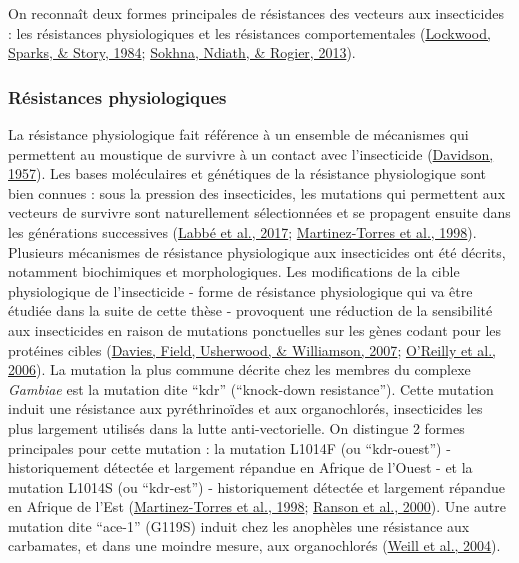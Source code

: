 \documentclass[12pt,twoside]{reedthesis}
\begin{document}
On reconnaît deux formes principales de résistances des vecteurs aux insecticides : les résistances physiologiques et les résistances comportementales (\protect\hyperlink{ref-lockwood_evolution_1984}{Lockwood, Sparks, \& Story, 1984}; \protect\hyperlink{ref-sokhna_changes_2013}{Sokhna, Ndiath, \& Rogier, 2013}).\\

\hypertarget{ruxe9sistances-physiologiques}{%
\subsubsection{Résistances physiologiques}\label{ruxe9sistances-physiologiques}}

La résistance physiologique fait référence à un ensemble de mécanismes qui permettent au moustique de survivre à un contact avec l'insecticide (\protect\hyperlink{ref-davidson_insecticide_1957}{Davidson, 1957}). Les bases moléculaires et génétiques de la résistance physiologique sont bien connues : sous la pression des insecticides, les mutations qui permettent aux vecteurs de survivre sont naturellement sélectionnées et se propagent ensuite dans les générations successives (\protect\hyperlink{ref-labbe_evolution_2017}{Labbé et al., 2017}; \protect\hyperlink{ref-martinez-torres_molecular_1998}{Martinez-Torres et al., 1998}).\\

Plusieurs mécanismes de résistance physiologique aux insecticides ont été décrits, notamment biochimiques et morphologiques. Les modifications de la cible physiologique de l'insecticide - forme de résistance physiologique qui va être étudiée dans la suite de cette thèse - provoquent une réduction de la sensibilité aux insecticides en raison de mutations ponctuelles sur les gènes codant pour les protéines cibles (\protect\hyperlink{ref-davies_ddt_2007}{Davies, Field, Usherwood, \& Williamson, 2007}; \protect\hyperlink{ref-oreilly_modelling_2006}{O'Reilly et al., 2006}). La mutation la plus commune décrite chez les membres du complexe \emph{Gambiae} est la mutation dite ``kdr'' (``knock-down resistance''). Cette mutation induit une résistance aux pyréthrinoïdes et aux organochlorés, insecticides les plus largement utilisés dans la lutte anti-vectorielle. On distingue 2 formes principales pour cette mutation : la mutation L1014F (ou ``kdr-ouest'') - historiquement détectée et largement répandue en Afrique de l'Ouest - et la mutation L1014S (ou ``kdr-est'') - historiquement détectée et largement répandue en Afrique de l'Est (\protect\hyperlink{ref-martinez-torres_molecular_1998}{Martinez-Torres et al., 1998}; \protect\hyperlink{ref-ranson_identification_2000}{Ranson et al., 2000}). Une autre mutation dite ``ace-1'' (G119S) induit chez les anophèles une résistance aux carbamates, et dans une moindre mesure, aux organochlorés (\protect\hyperlink{ref-weill_unique_2004}{Weill et al., 2004}).\\
\end{document}
